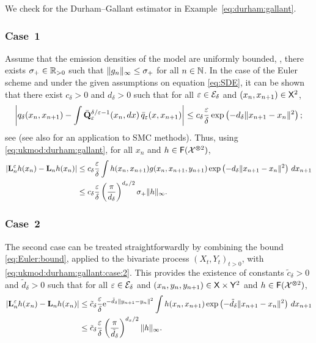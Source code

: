 \begin{example}
We check  for the Durham--Gallant estimator in Example~\ref{eq:durham:gallant}. 

\subsubsection*{Case~1}
Assume that the emission densities of the model are uniformly bounded, \ie, there exists $\sigma_+ \in \mathbb{R}_{> 0}$ such that $\| g_{n} \|_\infty \leq \sigma_+$ for all $n \in \mathbb{N}$. In the case of the Euler scheme and under the given assumptions on equation \eqref{eq:SDE}, it can be shown that there exist $c_\delta > 0$ and $d_\delta > 0$ such that for all $\varepsilon \in \mathcal{E}_\delta$ and $(x_n, x_{n + 1}) \in \mathsf{X}^2$, 
\begin{equation} \label{eq:Euler:bound}
\left| q_\delta(x_n, x_{n + 1}) - \int \bar{\kernel{Q}}^{\delta / \precpar - 1}_\precpar(x_n, \rmd x) \, \bar{q}_\precpar(x, x_{n + 1}) \right|\leq c_\delta \frac{\precpar}{\delta} \exp \left( - d_\delta \| x_{n + 1} - x_n \|^2\right);  
\end{equation}
see \cite{bally:talay:1996} (see also \cite{delmoral:jacod:2001} for an application to SMC methods). Thus, using \eqref{eq:ukmod:durham:gallant}, for all $x_n$ and $h \in \mathsf{F}(\mathcal{X}^{\varotimes 2})$,
\begin{align*}
\left|\ukmod{n} h (x_n) - \uk{n} h (x_n) \right|&\leq c_\delta \frac{\precpar}{\delta} \int h(x_n, x_{n + 1}) g(x_n, x_{n + 1}, y_{n + 1}) \exp \left( - d_\delta \| x_{n + 1} - x_n \|^2\right) \, \rmd x_{n + 1} \\
&\leq c_\delta \frac{\precpar}{\delta} \left( \frac{\pi}{d_\delta} \right)^{d_x / 2} \sigma_+ \|h \|_\infty.  
\end{align*}

\subsubsection*{Case~2}

The second case can be treated straightforwardly by combining the bound \eqref{eq:Euler:bound}, applied to the bivariate process $(X_t, Y_t)_{t > 0}$, with \eqref{eq:ukmod:durham:gallant:case:2}. This provides the existence of constants $\tilde{c}_\delta > 0$ and $\tilde{d}_\delta > 0$ such that for all $\varepsilon \in \mathcal{E}_\delta$ and $(x_n, y_n, y_{n + 1}) \in \mathsf{X} \times \mathsf{Y}^2$ and $h \in \mathsf{F}(\mathcal{X}^{\varotimes 2})$,  
\begin{align*}
\left|\ukmod{n} h (x_n) - \uk{n} h (x_n) \right| &\leq \tilde{c}_\delta \frac{\precpar}{\delta} \mathrm{e}^{- \tilde{d}_\delta \| y_{n + 1} -y_n \|^2} \int h(x_n, x_{n + 1}) \exp \left( - \tilde{d}_\delta \| x_{n + 1} - x_n \|^2\right) \, \rmd x_{n + 1} \\
&\leq \tilde{c}_\delta \frac{\precpar}{\delta} \left( \frac{\pi}{\tilde{d}_\delta} \right)^{d_x / 2} \|h \|_\infty.  
\end{align*}

\end{example}

